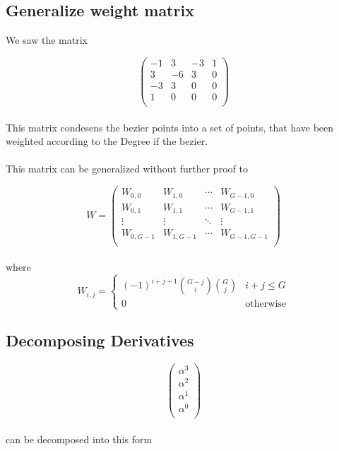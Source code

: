 \subsection{Generalize weight matrix}

We saw the matrix

\begin{equation*}
    \left(
    \begin{array}{cccc}
        -1 & 3  & -3 & 1 \\
        3  & -6 & 3  & 0 \\
        -3 & 3  & 0  & 0 \\
        1  & 0  & 0  & 0 \\
    \end{array}
    \right)
\end{equation*}
\\
This matrix condesens the bezier points into a set of points, that have been weighted according to the Degree if the bezier.
\\
\\
This matrix can be generalized without further proof to

\begin{equation*}
    W=
    \left(
    \begin{array}{cccc}
        W_{0,0}   & W_{1,0}   & \cdots & W_{G-1,0}   \\
        W_{0,1}   & W_{1,1}   & \cdots & W_{G-1,1}   \\
        \vdots    & \vdots    & \ddots & \vdots      \\
        W_{0,G-1} & W_{1,G-1} & \cdots & W_{G-1,G-1} \\
    \end{array}
    \right)
\end{equation*}
\\
where
\\
\begin{equation*}
    W_{i,j}=\begin{cases}
        (-1)^{i+j+1} {G-j \choose i} {G \choose j} & i + j \le G      \\
        0 & \text{otherwise}
    \end{cases}
\end{equation*}

\subsection{Decomposing Derivatives}

\begin{equation*}
    \left(
    \begin{array}{cccc}
        \alpha ^3 \\
        \alpha ^2 \\
        \alpha ^1 \\
        \alpha ^0 \\
    \end{array}
    \right)
\end{equation*}
\\
can be decomposed into this form

